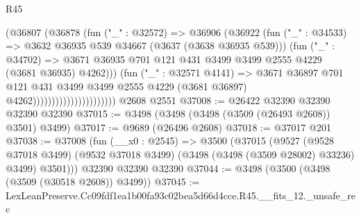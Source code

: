 \begin{lexlean}{R45}
\begin{coremodule}
                                          (@36807
                                            (@36878
                                              (fun ("_" : @32572) =>
                                              @36906
                                                (@36922
                                                  (fun ("_" : @34533) =>
                                                  @3632
                                                    @36935
                                                    @539
                                                    @34667
                                                    (@3637 (@3638 @36935 @539)))
                                                  (fun ("_" : @34702) =>
                                                  @3671
                                                    @36935
                                                    @701
                                                    @121
                                                    @431
                                                    @3499
                                                    @3499
                                                    @2555
                                                    @4229
                                                    (@3681 @36935)
                                                    @4262)))
                                              (fun ("_" : @32571 @4141) =>
                                              @3671
                                                @36897
                                                @701
                                                @121
                                                @431
                                                @3499
                                                @3499
                                                @2555
                                                @4229
                                                (@3681 @36897)
                                                @4262))))))))))))))))))))))
    @2608
    @2551
@37008 := @26422 @32390 @32390 @32390 @32390
@37015 := @3498 (@3498 (@3498 (@3509 (@26493 @2608)) @3501) @3499)
@37017 := @9689 (@26496 @2608)
@37018 := @37017 @201
@37038 := @37008
    (fun (__x0 : @2545) =>
    @3500
      (@37015
        (@9527
          (@9528 @37018 @3499)
          (@9532 @37018 @3499)
          (@3498 (@3498 (@3509 @28002) @33236) @3499)
          @3501)))
    @32390
    @32390
    @32390
@37044 := @3498 (@3500 (@3498 (@3509 (@30518 @2608)) @3499))
@37045 := LexLeanPreserve.Cc09fdf1ea1b00fa93c02bea5d66d4cce.R45.__fits_12._unsafe_rec

\end{coremodule}
\end{lexlean}
